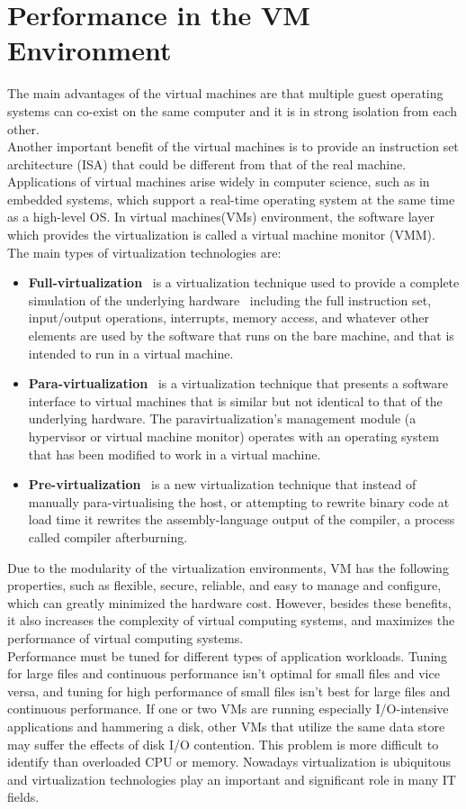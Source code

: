 \section{Performance in the VM Environment}
The main advantages of the virtual machines are that multiple guest operating systems can co-exist on the same computer and it is in 
strong isolation from  each other.\\
Another important benefit of the virtual machines is to provide an instruction set architecture (ISA) that could be different from that 
of the real machine. Applications of virtual machines arise widely in computer science, such as in embedded systems, which support a 
real-time operating system at the same time as a high-level OS. In virtual machines(VMs) environment, the software layer which provides 
the virtualization is called a  virtual machine monitor (VMM).
The main types of virtualization technologies are:
\begin{itemize}
  \item {\bf Full-virtualization} \textendash\ is a virtualization technique used to provide a complete simulation of the underlying hardware \textendash\
  including the full instruction set, input/output operations, interrupts, memory access, and whatever other elements are used by the software 
  that runs on the bare machine, and that is intended to run in a virtual machine.
  \item {\bf Para-virtualization} \textendash\ is a virtualization technique that presents a software interface to virtual machines that is similar but 
  not identical to that of the underlying hardware. The paravirtualization's management module (a hypervisor or virtual machine monitor) operates with 
  an operating system that has been modified to work in a virtual machine.
  \item {\bf Pre-virtualization} \textendash\ is a new virtualization technique that instead of manually para-virtualising the host, or attempting to 
  rewrite binary code at load time it rewrites the assembly-language output of the compiler, a process called compiler afterburning.
\end{itemize}
Due to the modularity of the virtualization environments, VM has the following properties, such as flexible, secure, reliable, and easy to manage and 
configure, which can greatly minimized the hardware cost. However, besides these benefits, it also increases the complexity of virtual computing systems, 
and maximizes the performance of virtual computing systems.\\
Performance must be tuned for different types of application workloads. Tuning for large files and continuous performance isn't optimal for small files 
and vice versa, and tuning for high performance of small files isn't best for large files and continuous performance. If one or two VMs are running 
especially I/O-intensive applications and hammering a disk, other VMs that utilize the same data store may suffer the effects of disk I/O contention.
This problem is more difficult to identify than overloaded CPU or memory. Nowadays virtualization is ubiquitous and virtualization technologies play an 
important and significant role in many IT fields.
